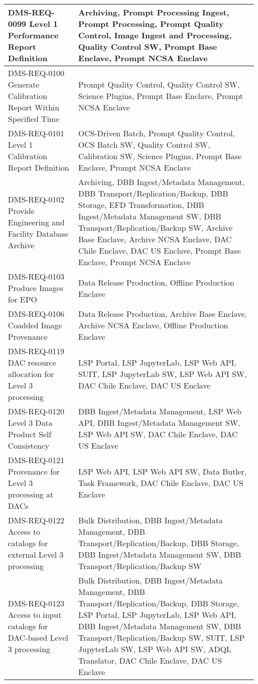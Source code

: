 \begin{longtable}{p{}p{}}
DMS-REQ-0099 Level 1 Performance Report Definition & Archiving, Prompt Processing Ingest, Prompt Processing, Prompt Quality Control, Image Ingest and Processing, Quality Control SW, Prompt Base Enclave, Prompt NCSA Enclave \\ \hline
DMS-REQ-0100 Generate Calibration Report Within Specified Time & Prompt Quality Control, Quality Control SW, Science Plugins, Prompt Base Enclave, Prompt NCSA Enclave \\ \hline
DMS-REQ-0101 Level 1 Calibration Report Definition & OCS-Driven Batch, Prompt Quality Control, OCS Batch SW, Quality Control SW, Calibration SW, Science Plugins, Prompt Base Enclave, Prompt NCSA Enclave \\ \hline
DMS-REQ-0102 Provide Engineering and Facility Database Archive & Archiving, DBB Ingest/Metadata Management, DBB Transport/Replication/Backup, DBB Storage, EFD Transformation, DBB Ingest/Metadata Management SW, DBB Transport/Replication/Backup SW, Archive Base Enclave, Archive NCSA Enclave, DAC Chile Enclave, DAC US Enclave, Prompt Base Enclave, Prompt NCSA Enclave \\ \hline
DMS-REQ-0103 Produce Images for EPO & Data Release Production, Offline Production Enclave \\ \hline
DMS-REQ-0106 Coadded Image Provenance & Data Release Production, Archive Base Enclave, Archive NCSA Enclave, Offline Production Enclave \\ \hline
DMS-REQ-0119 DAC resource allocation for Level 3 processing & LSP Portal, LSP JupyterLab, LSP Web API, SUIT, LSP JupyterLab SW, LSP Web API SW, DAC Chile Enclave, DAC US Enclave \\ \hline
DMS-REQ-0120 Level 3 Data Product Self Consistency & DBB Ingest/Metadata Management, LSP Web API, DBB Ingest/Metadata Management SW, LSP Web API SW, DAC Chile Enclave, DAC US Enclave \\ \hline
DMS-REQ-0121 Provenance for Level 3 processing at DACs & LSP Web API, LSP Web API SW, Data Butler, Task Framework, DAC Chile Enclave, DAC US Enclave \\ \hline
DMS-REQ-0122 Access to catalogs for external Level 3 processing & Bulk Distribution, DBB Ingest/Metadata Management, DBB Transport/Replication/Backup, DBB Storage, DBB Ingest/Metadata Management SW, DBB Transport/Replication/Backup SW \\ \hline
DMS-REQ-0123 Access to input catalogs for DAC-based Level 3 processing & Bulk Distribution, DBB Ingest/Metadata Management, DBB Transport/Replication/Backup, DBB Storage, LSP Portal, LSP JupyterLab, LSP Web API, DBB Ingest/Metadata Management SW, DBB Transport/Replication/Backup SW, SUIT, LSP JupyterLab SW, LSP Web API SW, ADQL Translator, DAC Chile Enclave, DAC US Enclave \\ \hline

\end{longtable}
